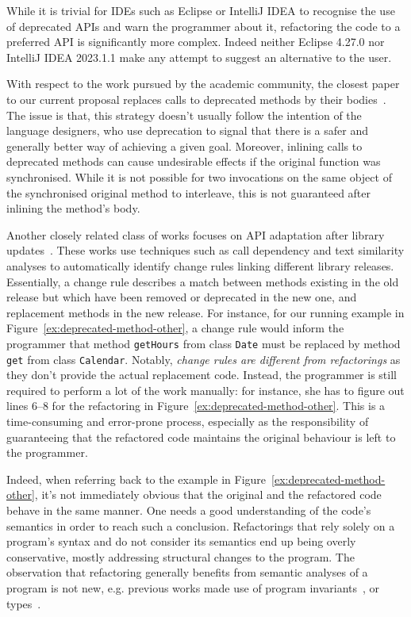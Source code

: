 \documentclass[10pt,conference]{IEEEtran}
\begin{document}
While it is trivial for IDEs such as Eclipse or IntelliJ IDEA to
recognise the use of deprecated APIs and warn the programmer about it,
refactoring the code to a preferred API is significantly more
complex. Indeed neither Eclipse 4.27.0 nor IntelliJ IDEA 2023.1.1 make
any attempt to suggest an alternative to the user.

With respect to the work pursued by the academic community, 
the closest paper to our current proposal
replaces calls
to deprecated methods by their
bodies~\cite{DBLP:conf/paste/Perkins05}.  The issue is that, this
strategy doesn't usually follow the intention of the language designers, who
use deprecation to signal that there is a safer and generally better
way of achieving a given goal.  Moreover, inlining calls to deprecated
methods can cause undesirable effects if the original function was
synchronised.  While it is not possible for two invocations on the
same object of the synchronised original method to interleave, this is
not guaranteed after inlining the method's body.


Another closely related class of works focuses on API adaptation after library updates~\cite{DBLP:conf/icse/WuGAK10,DBLP:conf/kbse/Huang0PW021}. These works use techniques such as call dependency and text similarity analyses to automatically identify change rules linking different library releases. Essentially, a change rule describes a match between methods existing in the old release but which have been removed or deprecated in the new one, and replacement methods in the new release. For instance, for our running example in Figure~\ref{ex:deprecated-method-other}, a change rule would inform the programmer that  method \texttt{getHours} from class \texttt{Date} must be replaced by method \texttt{get} from class \texttt{Calendar}. Notably, {\em change rules are different from refactorings} as they don't provide the actual replacement code. Instead, the programmer is still required to perform a lot of the work
manually: for instance, she has to figure out lines 6--8 for the refactoring in Figure~\ref{ex:deprecated-method-other}. This is a time-consuming and error-prone process, especially as the
responsibility of guaranteeing that the refactored code maintains the original behaviour
is left to the programmer.

Indeed, when referring back to the example in
Figure~\ref{ex:deprecated-method-other}, it's not immediately obvious
that the original and the refactored code behave in the same manner.
One needs a good understanding of the code's semantics in order to
reach such a conclusion.  Refactorings that rely solely on a
program's syntax and do not consider its semantics end up being overly
conservative, mostly addressing structural changes to the program.
The observation that refactoring generally benefits from semantic
analyses of a program is not new, e.g. previous works made use of
program invariants~\cite{Kataoka:2001:ASP:846228.848644}, or
types~\cite{Steimann2011,Steimann2012Pilgrim,Steimann2011KollePilgrim}.
\end{document}
